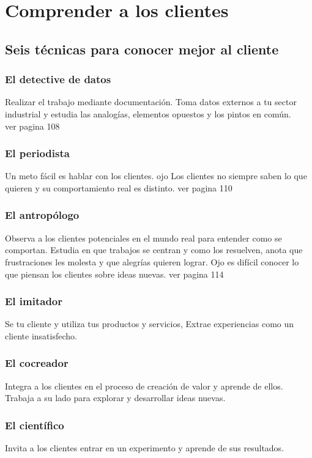 \documentclass[11pt]{book}
\begin{document}
\section{Comprender a los clientes}
\subsection{Seis técnicas para conocer mejor al cliente}
\subsubsection{El detective de datos}
Realizar el trabajo mediante documentación. Toma datos externos a tu sector industrial y estudia las analogías, elementos opuestos y los pintos en común.\\ ver pagina 108

\subsubsection{El periodista}
Un meto fácil es hablar con los clientes. ojo Los clientes no siempre saben lo que quieren y su comportamiento real es distinto. ver pagina 110
\subsubsection{El antropólogo}
Observa a los clientes potenciales en el mundo real para entender como se comportan. Estudia en que trabajos se centran y como los resuelven, anota que frustraciones les molesta y que alegrías quieren lograr. Ojo es difícil conocer lo que piensan los clientes sobre ideas nuevas. ver pagina 114
\subsubsection{El imitador}
Se tu cliente y utiliza tus productos y servicios, Extrae experiencias como un cliente insatisfecho.
\subsubsection{El cocreador}
Integra a los clientes en el proceso de creación de valor y aprende de ellos. Trabaja a su lado para explorar y desarrollar ideas nuevas.

\subsubsection{El científico}
Invita a los clientes entrar en un experimento y aprende de sus resultados.
\end{document}
